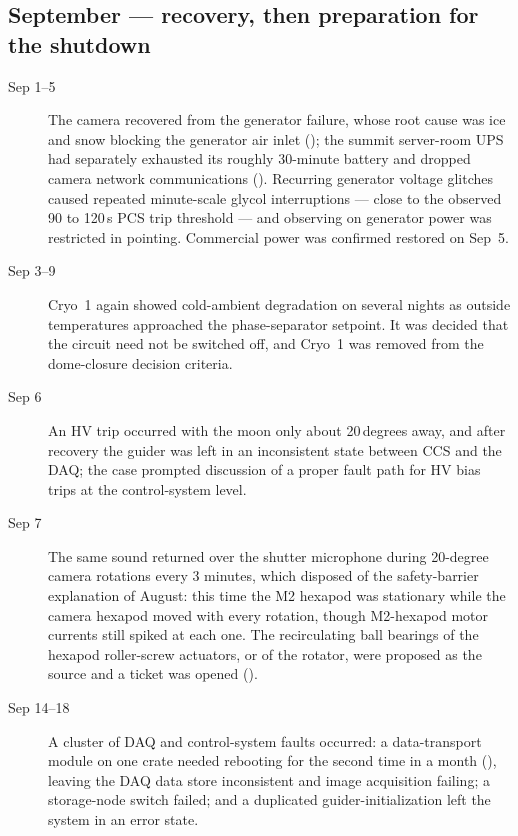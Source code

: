 \subsection{September --- recovery, then preparation for the shutdown}
\begin{description}
\item[Sep 1--5] The camera recovered from the generator failure, whose
  root cause was ice and snow blocking the generator air inlet
  (); the summit server-room UPS had separately exhausted its
  roughly 30-minute battery and dropped camera network communications
  ().  Recurring generator voltage glitches caused repeated
  minute-scale glycol interruptions --- close to the observed 90 to
  120\,s PCS trip threshold --- and observing on generator power was
  restricted in pointing.  Commercial power was confirmed restored on
  Sep~5.

\item[Sep 3--9] Cryo~1 again showed cold-ambient degradation on
  several nights as outside temperatures approached the
  phase-separator setpoint.  It was decided that the circuit need not
  be switched off, and Cryo~1 was removed from the dome-closure
  decision criteria.

\item[Sep 6] An HV trip occurred with the moon only about 20\,degrees
  away, and after recovery the guider was left in an inconsistent
  state between CCS and the DAQ; the case prompted discussion of a
  proper fault path for HV bias trips at the control-system level.

\item[Sep 7] The same sound returned over the shutter microphone during
  20-degree camera rotations every 3 minutes, which disposed of the
  safety-barrier explanation of August: this time the M2 hexapod was
  stationary while the camera hexapod moved with every rotation, though
  M2-hexapod motor currents still spiked at each one.  The recirculating
  ball bearings of the hexapod roller-screw actuators, or of the rotator,
  were proposed as the source and a ticket was opened
  ().

\item[Sep 14--18] A cluster of DAQ and control-system faults occurred:
  a data-transport module on one crate needed rebooting for the second
  time in a month (), leaving the DAQ data store
  inconsistent and image acquisition failing; a storage-node switch
  failed; and a duplicated guider-initialization left the system in an
  error state.


\end{description}
